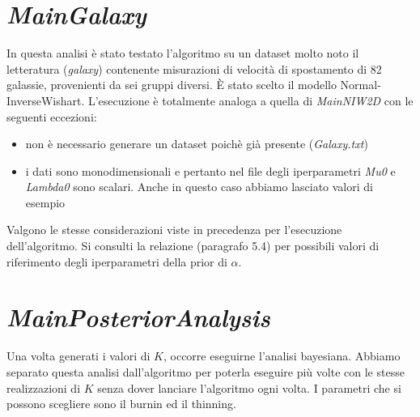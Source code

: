\documentclass[a4paper,12pt]{report}							%
\begin{document}
\section{\textit{MainGalaxy}}
In questa analisi è stato testato l'algoritmo su un dataset molto noto il letteratura (\textit{galaxy}) contenente misurazioni di velocità di 
spostamento di 82 galassie, provenienti da sei gruppi diversi.
È stato scelto il modello Normal-InverseWishart.
L'esecuzione è totalmente analoga a quella 
di \textit{MainNIW2D} con le seguenti eccezioni:
\begin{itemize}
 \item non è necessario generare un dataset poichè già presente (\textit{Galaxy.txt})
 \item i dati sono monodimensionali e pertanto nel file degli iperparametri \textit{Mu0} e \textit{Lambda0} sono scalari. Anche in questo
 caso abbiamo lasciato valori di esempio
\end{itemize}

Valgono le stesse considerazioni viste in precedenza per l'esecuzione dell'algoritmo. 
Si consulti la relazione (paragrafo 5.4) per possibili valori di riferimento degli iperparametri della prior di $\alpha$. 

\section{\textit{MainPosteriorAnalysis}}
Una volta generati i valori di $K$, occorre eseguirne l'analisi bayesiana. 
Abbiamo separato questa analisi dall'algoritmo per poterla eseguire più volte con le stesse realizzazioni di $K$ 
senza dover lanciare l'algoritmo ogni volta. I parametri che si possono scegliere sono il burnin ed il thinning.
\end{document}
